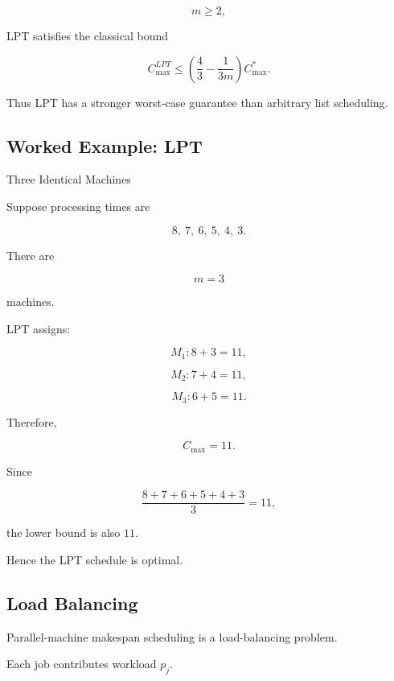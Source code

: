 \[
m\geq2,
\]

LPT satisfies the classical bound

\[
\boxed{
C_{\max}^{LPT}
\leq
\left(
\frac43
-
\frac{1}{3m}
\right)
C_{\max}^*.
}
\]

Thus LPT has a stronger worst-case guarantee than arbitrary list
scheduling.

\subsection{Worked Example: LPT}
\label{subsec:worked-lpt}

\begin{workedexamplebox}{Three Identical Machines}

Suppose processing times are

\[
8,\ 7,\ 6,\ 5,\ 4,\ 3.
\]

There are

\[
m=3
\]

machines.

LPT assigns:

\[
M_1:
8+3=11,
\]

\[
M_2:
7+4=11,
\]

\[
M_3:
6+5=11.
\]

Therefore,

\begin{answerbox}
\[
\boxed{
C_{\max}=11.
}
\]
\end{answerbox}

Since

\[
\frac{
8+7+6+5+4+3
}{
3
}
=
11,
\]

the lower bound is also \(11\).

Hence the LPT schedule is optimal.

\end{workedexamplebox}

\subsection{Load Balancing}
\label{subsec:scheduling-load-balancing}

Parallel-machine makespan scheduling is a load-balancing problem.

Each job contributes workload \(p_j\).

